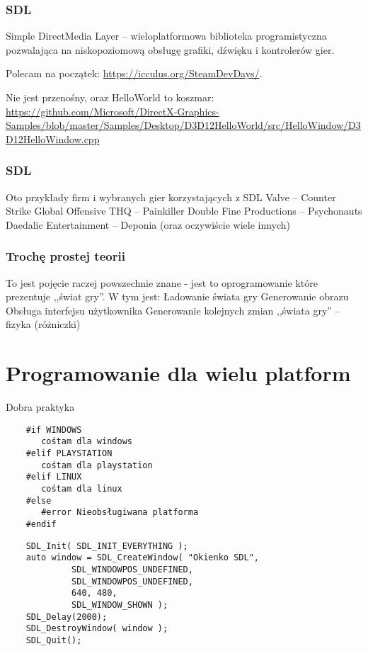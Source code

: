 \documentclass{beamer}
\begin{document}
\begin{frame}[fragile]
	\frametitle{SDL}
	Simple DirectMedia Layer -- wieloplatformowa biblioteka programistyczna pozwalająca na niskopoziomową obsługę grafiki, dźwięku i kontrolerów gier.
	
	Polecam na początek: \url{https://icculus.org/SteamDevDays/}.
	\EB
	
	Nie jest przenośny, oraz HelloWorld to koszmar:
	 \url{https://github.com/Microsoft/DirectX-Graphics-Samples/blob/master/Samples/Desktop/D3D12HelloWorld/src/HelloWindow/D3D12HelloWindow.cpp}
	\EB
\end{frame}

\begin{frame}[fragile]
	\frametitle{SDL}
	Oto przykłady firm i wybranych gier korzystających z SDL
	\BI
	\I Valve -- Counter Strike Global Offensive
	\I THQ -- Painkiller
	\I Double Fine Productions -- Psychonauts
	\I Daedalic Entertainment -- Deponia
	\I (oraz oczywiście wiele innych)
	\EI
	\EB
\end{frame}


\begin{frame}[fragile]
	\frametitle{Trochę prostej teorii}
	To jest pojęcie raczej powszechnie znane - jest to oprogramowanie które prezentuje ,,świat gry''.
	W tym jest:
	\BI
	 \I Ładowanie świata gry
	 \I Generowanie obrazu 
	 \I Obsługa interfejsu użytkownika
	 \I Generowanie kolejnych zmian ,,świata gry'' -- fizyka (różniczki)
	\EI
	\EB
\end{frame}



\section{Programowanie dla wielu platform}

\begin{frame}[fragile]
	Dobra praktyka
	\begin{verbatim}
	#if WINDOWS
	   cośtam dla windows
	#elif PLAYSTATION
	   cośtam dla playstation
	#elif LINUX
	   cośtam dla linux
	#else
	   #error Nieobsługiwana platforma
	#endif
	\end{verbatim}
	\EB
\end{frame}


\begin{frame}[fragile]
	\begin{verbatim}
    SDL_Init( SDL_INIT_EVERYTHING ); 
    auto window = SDL_CreateWindow( "Okienko SDL", 
             SDL_WINDOWPOS_UNDEFINED, 
             SDL_WINDOWPOS_UNDEFINED, 
             640, 480, 
             SDL_WINDOW_SHOWN ); 
    SDL_Delay(2000);
    SDL_DestroyWindow( window );
    SDL_Quit();
 	\end{verbatim}
 	\EB
\end{frame}
\end{document}
